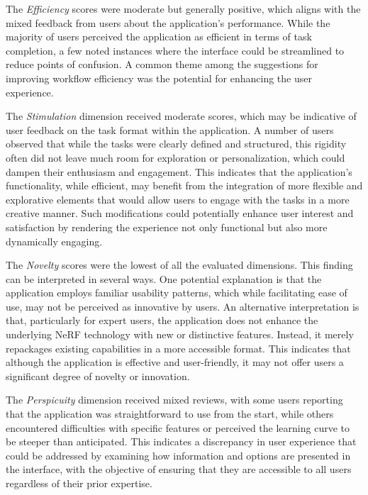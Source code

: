 The \emph{Efficiency} scores were moderate but generally positive, which aligns with the mixed feedback from users about the application's performance. 
While the majority of users perceived the application as efficient in terms of task completion, a few noted instances where the interface could be streamlined to reduce points of confusion.
A common theme among the suggestions for improving workflow efficiency was the potential for enhancing the user experience.

The \emph{Stimulation} dimension received moderate scores, which may be indicative of user feedback on the task format within the application. 
A number of users observed that while the tasks were clearly defined and structured, this rigidity often did not leave much room for exploration or personalization, which could dampen their enthusiasm and engagement. 
This indicates that the application's functionality, while efficient, may benefit from the integration of more flexible and explorative elements that would allow users to engage with the tasks in a more creative manner. 
Such modifications could potentially enhance user interest and satisfaction by rendering the experience not only functional but also more dynamically engaging.

The \emph{Novelty} scores were the lowest of all the evaluated dimensions. This finding can be interpreted in several ways. 
One potential explanation is that the application employs familiar usability patterns, which while facilitating ease of use, may not be perceived as innovative by users. 
An alternative interpretation is that, particularly for expert users, the application does not enhance the underlying NeRF technology with new or distinctive features. Instead, it merely repackages existing capabilities in a more accessible format. 
This indicates that although the application is effective and user-friendly, it may not offer users a significant degree of novelty or innovation.

The \emph{Perspicuity} dimension received mixed reviews, with some users reporting that the application was straightforward to use from the start, while others encountered difficulties with specific features or perceived the learning curve to be steeper than anticipated. 
This indicates a discrepancy in user experience that could be addressed by examining how information and options are presented in the interface, with the objective of ensuring that they are accessible to all users regardless of their prior expertise.

